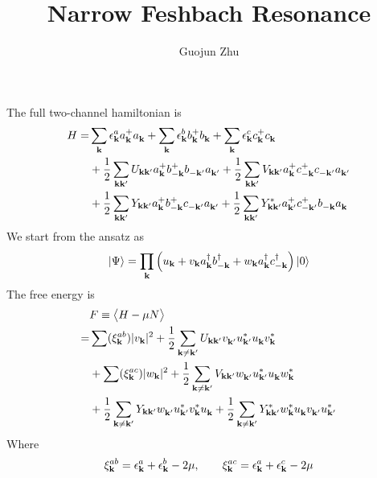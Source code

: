 \documentclass{article}
\author{Guojun Zhu}
\title{Narrow Feshbach Resonance}
\begin{document}
\maketitle

{}
\section{}
 The full two-channel hamiltonian is
\begin{equation}\label{eq:uvw:hamiltonian}
\begin{split}
 H=&\sum_\vk\epsilon^a_\vk{}a^+_\vk{}a^{}_\vk+\sum_\vk\epsilon^b_\vk{}b^+_\vk{}b^{}_\vk+\sum_\vk\epsilon^c_\vk{}c^+_\vk{}c^{}_\vk\\
  &+\nth{2}\sum_{\vk\vk'}U_{\vk\vk'}a^+_\vk{}b^+_{-\vk}{}b^{}_{-\vk'}a^{}_{\vk'}
	+\nth{2}\sum_{\vk\vk'}V_{\vk\vk'}a^+_\vk{}c^+_{-\vk}{}c^{}_{-\vk'}a^{}_{\vk'}\\
 &+\nth{2}\sum_{\vk\vk'}Y_{\vk\vk'}a^+_\vk{}b^+_{-\vk}{}c^{}_{-\vk'}a^{}_{\vk'}
	+\nth{2}\sum_{\vk\vk'}Y^*_{\vk\vk'}a^+_{\vk'}{}c^+_{-\vk'}{}b^{}_{-\vk}a^{}_{\vk}
\end{split} 
\end{equation}
 We start from the ansatz as 
\begin{equation}\label{eq:ansatz}
 \ket{\Psi}=\prod_\vk\br{u_\vk+v_\vk{}a^\dg_\vk{}b^\dg_{-\vk}+w_\vk{}a^\dg_\vk{}c^\dg_{-\vk}}\ket{0}
\end{equation}
The free energy is 
\begin{equation}\label{eq:uvw:F}
 \begin{split}
  &F\equiv\av{H-\mu{}N}\\
    =&\sum(\xi^{ab}_\vk)\abs{v_\vk}^2+\nth2\sum_{\vk\neq\vk'}U_{\vk\vk'}v^{}_{\vk'}u^*_{\vk'}u^{}_\vk{}v^*_\vk\\
    &+\sum(\xi^{ac}_\vk)\abs{w_\vk}^2
      +\nth2\sum_{\vk\neq\vk'}V_{\vk\vk'}w^{}_{\vk'}u^*_{\vk'}u^{}_\vk{}w^*_\vk\\
    &  +\nth2\sum_{\vk\neq\vk'}Y_{\vk\vk'}w^{}_{\vk'}{u^{*}_{\vk'}}v^*_\vk{}u^{}_\vk
        +\nth2\sum_{\vk\neq\vk'}Y^*_{\vk\vk'}w^*_{\vk}{u^{}_{\vk}}v^{}_{\vk'}{}u^{*}_{\vk'}
 \end{split}
\end{equation}
Where 
\begin{equation*}
 \xi^{ab}_\vk=\epsilon^a_\vk+\epsilon^b_\vk-2\mu,\qquad
  \xi^{ac}_\vk=\epsilon^a_\vk+\epsilon^c_\vk-2\mu
 \end{equation*}
\end{document}
